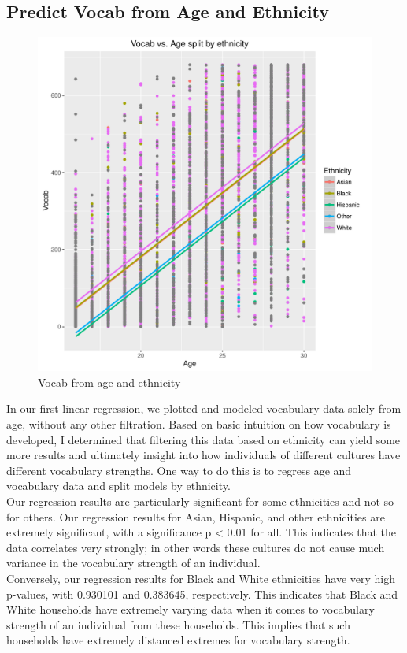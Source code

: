 \documentclass{article}
\begin{document}
    \subsection*{Predict Vocab from Age and Ethnicity}
      \begin{figure}[H]
        \includegraphics[width=\linewidth]{vocab_from_age_and_ethnicity.pdf}
        \caption{Vocab from age and ethnicity}
        \label{fig:regression3}
      \end{figure}
      In our first linear regression, we plotted and modeled vocabulary data solely from age, without any other filtration. Based on basic intuition on how vocabulary is developed, I determined that filtering this data based on ethnicity can yield some more results and ultimately insight into how individuals of different cultures have different vocabulary strengths. One way to do this is to regress age and vocabulary data and split models by ethnicity. \\
      Our regression results are particularly significant for some ethnicities and not so for others. Our regression results for Asian, Hispanic, and other ethnicities are extremely significant, with a significance p < 0.01 for all. This indicates that the data correlates very strongly; in other words these cultures do not cause much variance in the vocabulary strength of an individual. \\
      Conversely, our regression results for Black and White ethnicities have very high p-values, with 0.930101 and 0.383645, respectively. This indicates that Black and White households have extremely varying data when it comes to vocabulary strength of an individual from these households. This implies that such households have extremely distanced extremes for vocabulary strength.
      
\end{document}

